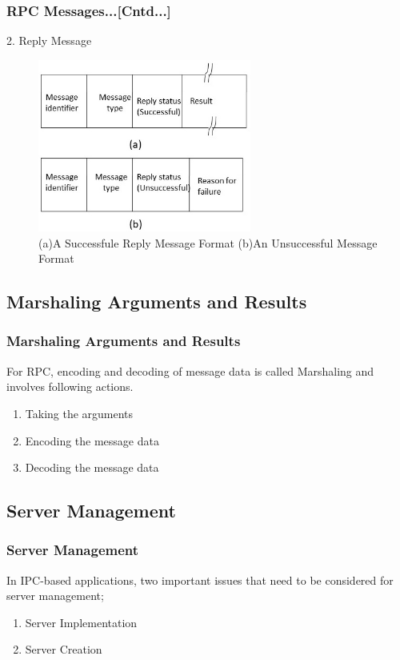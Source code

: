 \documentclass{beamer}
\begin{document}
\begin{frame}
	\frametitle{RPC Messages...[Cntd...]}
	\vspace{0.5cm}
	2. Reply Message\\
	\begin{figure}
		\centering
		\includegraphics[width=7cm]{fig44.jpg}
		\caption{(a)A Successfule Reply Message Format (b)An Unsuccessful Message Format}
	\end{figure}
\end{frame}


\subsection{Marshaling Arguments and Results}
\begin{frame}
	\frametitle{Marshaling Arguments and Results}
	For RPC, encoding and decoding of message data is called Marshaling and involves following actions.
	\begin{enumerate}
		\item Taking the arguments
		\item Encoding the message data
		\item Decoding the message data
	\end{enumerate}
	\vspace{0.5cm}
	\vspace{4cm}
\end{frame}

\subsection{Server Management}
\begin{frame}
	\frametitle{Server Management}
	In IPC-based  applications, two important issues that need to be considered for server management; 
	\vspace{0.5cm}
	\begin{enumerate}
		\item Server Implementation
		\item Server Creation
	\end{enumerate}
	\vspace{5cm}
\end{frame}
\end{document}

